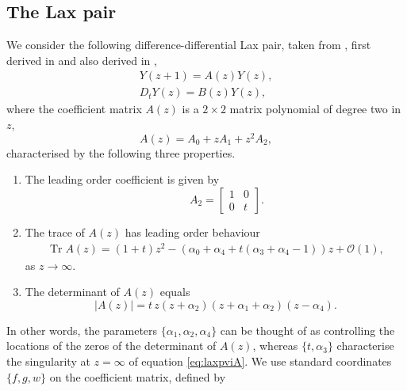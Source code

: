 \documentclass[a4paper,reqno]{amsart}
\numberwithin{equation}{section}
\numberwithin{figure}{section}
\theoremstyle{remark}
\begin{document}
\subsection{The Lax pair}\label{subsect:linP6}
We consider the following difference-differential Lax pair, taken from \cite{ormerodrains2017}, first derived in \cite{adler94} and also derived in \cite{borodin2006},
\begin{subequations}\label{eq:laxpVI}
\begin{align}
    Y(z+1)=A(z)Y(z),\label{eq:laxpviA}\\
    D_t Y(z)=B(z)Y(z),\label{eq:laxpviB}
\end{align}
\end{subequations}
where the coefficient matrix $A(z)$ is a $2\times 2$ matrix polynomial of degree two in $z$,
\begin{equation}\label{eq:pviAseries}
        A(z)=A_0+z A_1+z^2A_2,
    \end{equation}
    characterised by the following three properties.
\begin{enumerate}[label=(\roman*)]
\item The leading order coefficient is given by
\begin{equation*}
    \qquad A_2=\begin{bmatrix}
            1 & 0\\
            0 & t
        \end{bmatrix}.
\end{equation*}
    \item The trace of $A(z)$ has leading order behaviour
   \begin{equation}\label{eq:traceinf}
    \begin{aligned}
     \operatorname{Tr}A(z)=(1+t)z^2-(\alpha_0+\alpha_4+t(\alpha_3+\alpha_4-1))z+\mathcal{O}(1),
    \end{aligned}
   \end{equation}
    as $z\rightarrow \infty$.
    \item The determinant of $A(z)$ equals
\begin{equation}\label{eq:coefmatrixdet}
    |A(z)|=t\,z(z+\alpha_2)(z+\alpha_1+\alpha_2)(z-\alpha_4).
\end{equation}
\end{enumerate}
In other words, the parameters $\{\alpha_1,\alpha_2,\alpha_4\}$ can be thought of as controlling the locations of the zeros of the determinant of $A(z)$, whereas $\{t,\alpha_3\}$ characterise the singularity at $z=\infty$ of equation \eqref{eq:laxpviA}. We use standard coordinates $\{f,g,w\}$ on the coefficient matrix, defined by 
\end{document}
